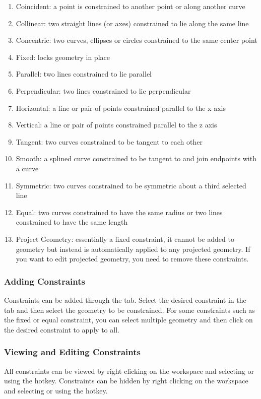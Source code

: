 \begin{enumerate}
\item Coincident: a point is constrained to another point or along another curve
\item Collinear: two straight lines (or axes) constrained to lie along the same line
\item Concentric: two curves, ellipses or circles constrained to the same center point
\item Fixed: locks geometry in place
\item Parallel: two lines constrained to lie parallel
\item Perpendicular: two lines constrained to lie perpendicular
\item Horizontal: a line or pair of points constrained parallel to the x axis
\item Vertical: a line or pair of points constrained parallel to the z axis
\item Tangent: two curves constrained to be tangent to each other
\item Smooth: a splined curve constrained to be tangent to and join endpoints with a curve
\item Symmetric: two curves constrained to be symmetric about a third selected line
\item Equal: two curves constrained to have the same radius or two lines constrained to have the same length
\item Project Geometry: essentially a fixed constraint, it cannot be added to geometry but instead is automatically applied to any projected geometry. If you want to edit projected geometry, you need to remove these constraints.
\end{enumerate}

\subsubsection{Adding Constraints}
Constraints can be added through the  tab. Select the desired constraint in the tab and then select the geometry to be constrained. For some constraints such as the fixed or equal constraint, you can select multiple geometry and then click on the desired constraint to apply to all.

\subsubsection{Viewing and Editing Constraints}
All constraints can be viewed by right clicking on the workspace and selecting  or using the  hotkey. Constraints can be hidden by right clicking on the workspace and selecting  or using the  hotkey.

